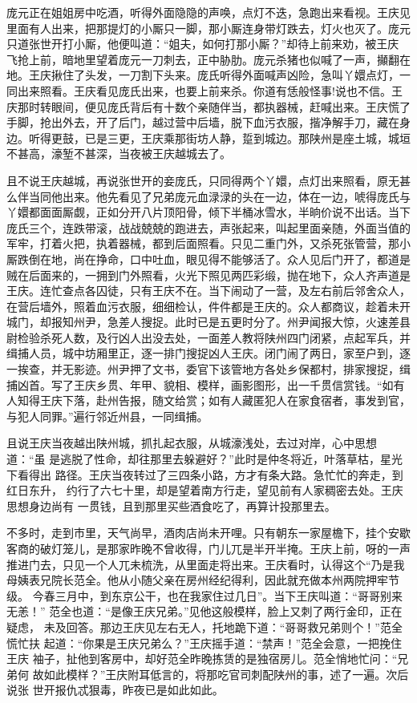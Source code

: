 庞元正在姐姐房中吃酒，听得外面隐隐的声唤，点灯不迭，急跑出来看视。王庆见
里面有人出来，把那提灯的小厮只一脚，那小厮连身带灯跌去，灯火也灭了。庞元
只道张世开打小厮，他便叫道：“姐夫，如何打那小厮？”却待上前来劝，被王庆
飞抢上前，暗地里望着庞元一刀刺去，正中胁肋。庞元杀猪也似喊了一声，攧翻在
地。王庆揪住了头发，一刀割下头来。庞氏听得外面喊声凶险，急叫丫嬛点灯，一
同出来照看。王庆看见庞氏出来，也要上前来杀。你道有恁般怪事!说也不信。王
庆那时转眼间，便见庞氏背后有十数个亲随伴当，都执器械，赶喊出来。王庆慌了
手脚，抢出外去，开了后门，越过营中后墙，脱下血污衣服，揩净解手刀，藏在身
边。听得更鼓，已是三更，王庆乘那街坊人静，踅到城边。那陕州是座土城，城垣
不甚高，濠堑不甚深，当夜被王庆越城去了。

且不说王庆越城，再说张世开的妾庞氏，只同得两个丫嬛，点灯出来照看，原无甚
么伴当同他出来。他先看见了兄弟庞元血渌渌的头在一边，体在一边，唬得庞氏与
丫嬛都面面厮觑，正如分开八片顶阳骨，倾下半桶冰雪水，半晌价说不出话。当下
庞氏三个，连跌带滚，战战兢兢的跑进去，声张起来，叫起里面亲随，外面当值的
军牢，打着火把，执着器械，都到后面照看。只见二重门外，又杀死张管营，那小
厮跌倒在地，尚在挣命，口中吐血，眼见得不能够活了。众人见后门开了，都道是
贼在后面来的，一拥到门外照看，火光下照见两匹彩缎，抛在地下，众人齐声道是
王庆。连忙查点各囚徒，只有王庆不在。当下闹动了一营，及左右前后邻舍众人，
在营后墙外，照着血污衣服，细细检认，件件都是王庆的。众人都商议，趁着未开
城门，却报知州尹，急差人搜捉。此时已是五更时分了。州尹闻报大惊，火速差县
尉检验杀死人数，及行凶人出没去处，一面差人教将陕州四门闭紧，点起军兵，并
缉捕人员，城中坊厢里正，逐一排门搜捉凶人王庆。闭门闹了两日，家至户到，逐
一挨查，并无影迹。州尹押了文书，委官下该管地方各处乡保都村，排家搜捉，缉
捕凶首。写了王庆乡贯、年甲、貌相、模样，画影图形，出一千贯信赏钱。“如有
人知得王庆下落，赴州告报，随文给赏；如有人藏匿犯人在家食宿者，事发到官，
与犯人同罪。”遍行邻近州县，一同缉捕。

且说王庆当夜越出陕州城，抓扎起衣服，从城濠浅处，去过对岸，心中思想道：“虽
是逃脱了性命，却往那里去躲避好？”此时是仲冬将近，叶落草枯，星光下看得出
路径。王庆当夜转过了三四条小路，方才有条大路。急忙忙的奔走，到红日东升，
约行了六七十里，却是望着南方行走，望见前有人家稠密去处。王庆思想身边尚有
一贯钱，且到那里买些酒食吃了，再算计投那里去。

不多时，走到市里，天气尚早，酒肉店尚未开哩。只有朝东一家屋檐下，挂个安歇
客商的破灯笼儿，是那家昨晚不曾收得，门儿兀是半开半掩。王庆上前，呀的一声
推进门去，只见一个人兀未梳洗，从里面走将出来。王庆看时，认得这个“乃是我
母姨表兄院长范全。他从小随父亲在房州经纪得利，因此就充做本州两院押牢节级。
今春三月中，到东京公干，也在我家住过几日”。当下王庆叫道：“哥哥别来无恙！”
范全也道：“是像王庆兄弟。”见他这般模样，脸上又刺了两行金印，正在疑虑，
未及回答。那边王庆见左右无人，托地跪下道：“哥哥救兄弟则个！”范全慌忙扶
起道：“你果是王庆兄弟么？”王庆摇手道：“禁声！”范全会意，一把挽住王庆
袖子，扯他到客房中，却好范全昨晚拣赁的是独宿房儿。范全悄地忙问：“兄弟何
故如此模样？”王庆附耳低言的，将那吃官司刺配陕州的事，述了一遍。次后说张
世开报仇忒狠毒，昨夜已是如此如此。


